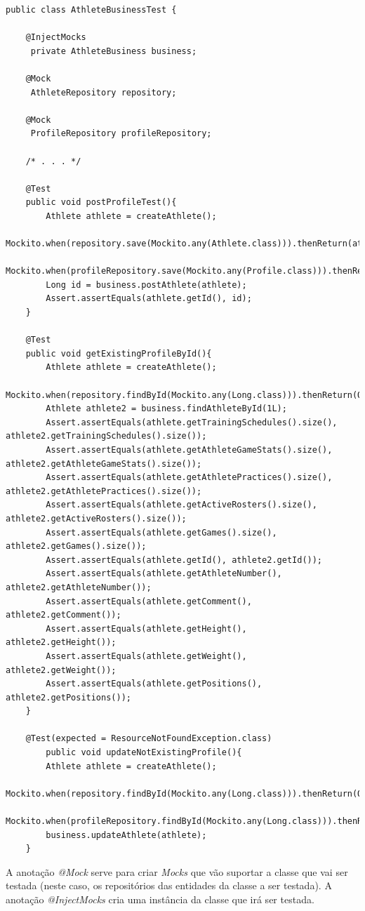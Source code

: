 \begin{lstlisting}
public class AthleteBusinessTest {

	@InjectMocks
	 private AthleteBusiness business;
	
	@Mock
	 AthleteRepository repository;
	
	@Mock
	 ProfileRepository profileRepository;
	
	/* . . . */
	
	@Test
	public void postProfileTest(){
		Athlete athlete = createAthlete();
		Mockito.when(repository.save(Mockito.any(Athlete.class))).thenReturn(athlete);
		Mockito.when(profileRepository.save(Mockito.any(Profile.class))).thenReturn(createProfile());
		Long id = business.postAthlete(athlete);
		Assert.assertEquals(athlete.getId(), id);
	}
	
	@Test
	public void getExistingProfileById(){
		Athlete athlete = createAthlete();
		Mockito.when(repository.findById(Mockito.any(Long.class))).thenReturn(Optional.of(athlete));
		Athlete athlete2 = business.findAthleteById(1L);
		Assert.assertEquals(athlete.getTrainingSchedules().size(), athlete2.getTrainingSchedules().size());
		Assert.assertEquals(athlete.getAthleteGameStats().size(), athlete2.getAthleteGameStats().size());
		Assert.assertEquals(athlete.getAthletePractices().size(), athlete2.getAthletePractices().size());
		Assert.assertEquals(athlete.getActiveRosters().size(), athlete2.getActiveRosters().size());
		Assert.assertEquals(athlete.getGames().size(), athlete2.getGames().size());
		Assert.assertEquals(athlete.getId(), athlete2.getId());
		Assert.assertEquals(athlete.getAthleteNumber(), athlete2.getAthleteNumber());
		Assert.assertEquals(athlete.getComment(), athlete2.getComment());
		Assert.assertEquals(athlete.getHeight(), athlete2.getHeight());
		Assert.assertEquals(athlete.getWeight(), athlete2.getWeight());
		Assert.assertEquals(athlete.getPositions(), athlete2.getPositions());
	}
	
	@Test(expected = ResourceNotFoundException.class)
		public void updateNotExistingProfile(){
		Athlete athlete = createAthlete();
		Mockito.when(repository.findById(Mockito.any(Long.class))).thenReturn(Optional.empty());
		Mockito.when(profileRepository.findById(Mockito.any(Long.class))).thenReturn(Optional.empty());
		business.updateAthlete(athlete);
	}
\end{lstlisting}

A anotação \textit{@Mock} serve para criar \textit{Mocks} que vão suportar a classe que vai ser testada (neste caso, os repositórios das entidades da classe a ser testada). A anotação \textit{@InjectMocks} cria uma instância da classe que irá ser testada.

